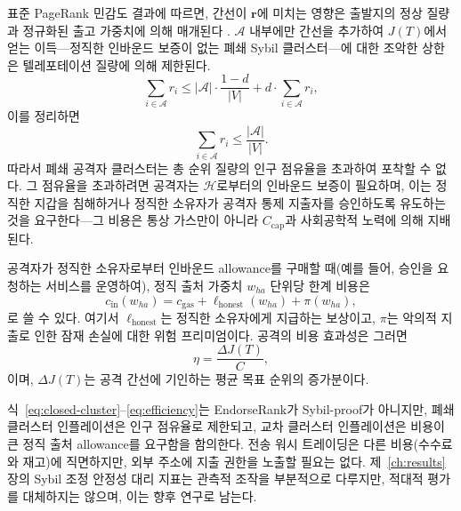 표준 PageRank 민감도 결과에 따르면, 간선이 $\mathbf{r}$에 미치는 영향은 출발지의 정상 질량과 정규화된 출고 가중치에 의해 매개된다 . $\mathcal{A}$ 내부에만 간선을 추가하여 $J(T)$에서 얻는 이득---정직한 인바운드 보증이 없는 폐쇄 Sybil 클러스터---에 대한 조악한 상한은 텔레포테이션 질량에 의해 제한된다.
\begin{equation}
\label{eq:closed-cluster}
\sum_{i\in\mathcal{A}} r_i \leq |\mathcal{A}|\cdot\frac{1-d}{|V|} + d\cdot \sum_{i\in\mathcal{A}} r_i,
\end{equation}
이를 정리하면
\begin{equation}
\label{eq:cluster-mass}
\sum_{i\in\mathcal{A}} r_i \leq \frac{|\mathcal{A}|}{|V|}.
\end{equation}
따라서 폐쇄 공격자 클러스터는 총 순위 질량의 인구 점유율을 초과하여 포착할 수 없다. 그 점유율을 초과하려면 공격자는 $\mathcal{H}$로부터의 인바운드 보증이 필요하며, 이는 정직한 지갑을 침해하거나 정직한 소유자가 공격자 통제 지출자를 승인하도록 유도하는 것을 요구한다---그 비용은 통상 가스만이 아니라 $C_{\mathrm{cap}}$과 사회공학적 노력에 의해 지배된다.

공격자가 정직한 소유자로부터 인바운드 allowance를 구매할 때(예를 들어, 승인을 요청하는 서비스를 운영하여), 정직 출처 가중치 $w_{h a}$ 단위당 한계 비용은
\begin{equation}
\label{eq:marginal}
c_{\mathrm{in}}(w_{h a}) = c_{\mathrm{gas}} + \ell_{\mathrm{honest}}(w_{h a}) + \pi(w_{h a}),
\end{equation}
로 쓸 수 있다. 여기서 $\ell_{\mathrm{honest}}$는 정직한 소유자에게 지급하는 보상이고, $\pi$는 악의적 지출로 인한 잠재 손실에 대한 위험 프리미엄이다. 공격의 비용 효과성은 그러면
\begin{equation}
\label{eq:efficiency}
\eta = \frac{\Delta J(T)}{C},
\end{equation}
이며, $\Delta J(T)$는 공격 간선에 기인하는 평균 목표 순위의 증가분이다.

식~\eqref{eq:closed-cluster}--\eqref{eq:efficiency}는 EndorseRank가 Sybil-proof가 아니지만, 폐쇄 클러스터 인플레이션은 인구 점유율로 제한되고, 교차 클러스터 인플레이션은 비용이 큰 정직 출처 allowance를 요구함을 함의한다. 전송 워시 트레이딩은 다른 비용(수수료와 재고)에 직면하지만, 외부 주소에 지출 권한을 노출할 필요는 없다. 제~\ref{ch:results}장의 Sybil 조정 안정성 대리 지표는 관측적 조작을 부분적으로 다루지만, 적대적 평가를 대체하지는 않으며, 이는 향후 연구로 남는다.


